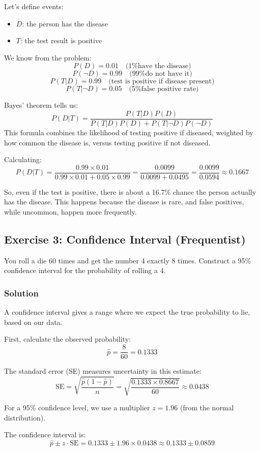 \documentclass{book}
\begin{document}
Let's define events:
\begin{itemize}
    \item $D$: the person has the disease
    \item $T$: the test result is positive
\end{itemize}

We know from the problem:
\[
P(D) = 0.01 \quad\text{(1\% have the disease)}
\]
\[
P(\neg D) = 0.99 \quad\text{(99\% do not have it)}
\]
\[
P(T | D) = 0.99 \quad\text{(test is positive if disease present)}
\]
\[
P(T | \neg D) = 0.05 \quad\text{(5\% false positive rate)}
\]

Bayes’ theorem tells us:
\[
P(D | T) = \frac{P(T|D)P(D)}{P(T|D)P(D) + P(T|\neg D)P(\neg D)}
\]
This formula combines the likelihood of testing positive if diseased, weighted by how common the disease is, versus testing positive if not diseased.

Calculating:
\[
P(D | T) = \frac{0.99 \times 0.01}{0.99 \times 0.01 + 0.05 \times 0.99} = \frac{0.0099}{0.0099 + 0.0495} = \frac{0.0099}{0.0594} \approx 0.1667
\]

So, even if the test is positive, there is about a 16.7\% chance the person actually has the disease. This happens because the disease is rare, and false positives, while uncommon, happen more frequently.

\subsection*{Exercise 3: Confidence Interval (Frequentist)}
You roll a die 60 times and get the number 4 exactly 8 times. Construct a 95\% confidence interval for the probability of rolling a 4.

\subsubsection*{Solution}
A confidence interval gives a range where we expect the true probability to lie, based on our data.

First, calculate the observed probability:
\[
\hat{p} = \frac{8}{60} = 0.1333
\]

The standard error (SE) measures uncertainty in this estimate:
\[
\text{SE} = \sqrt{\frac{\hat{p}(1 - \hat{p})}{n}} = \sqrt{\frac{0.1333 \times 0.8667}{60}} \approx 0.0438
\]

For a 95\% confidence level, we use a multiplier $z=1.96$ (from the normal distribution).

The confidence interval is:
\[
\hat{p} \pm z \cdot \text{SE} = 0.1333 \pm 1.96 \times 0.0438 \approx 0.1333 \pm 0.0859
\]
\end{document}
